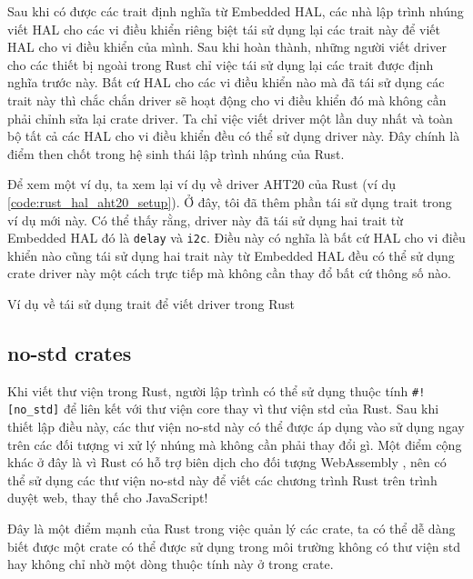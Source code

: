 Sau khi có được các trait định nghĩa từ Embedded HAL, các nhà lập trình nhúng viết HAL cho các vi điều khiển riêng biệt tái sử dụng lại các trait này để viết HAL cho vi điều khiển của mình.
Sau khi hoàn thành, những người viết driver cho các thiết bị ngoài trong Rust chỉ việc tái sử dụng lại các trait được định nghĩa trước này.
Bất cứ HAL cho các vi điều khiển nào mà đã tái sử dụng các trait này thì chắc chắn driver sẽ hoạt động cho vi điều khiển đó mà không cần phải chỉnh sửa lại crate driver.
Ta chỉ việc viết driver một lần duy nhất và toàn bộ tất cả các HAL cho vi điều khiển đều có thể sử dụng driver này.
Đây chính là điểm then chốt trong hệ sinh thái lập trình nhúng của Rust.

Để xem một ví dụ, ta xem lại ví dụ về driver AHT20 của Rust (ví dụ \ref{code:rust_hal_aht20_setup}).
Ở đây, tôi đã thêm phần tái sử dụng trait trong ví dụ mới này.
Có thể thấy rằng, driver này đã tái sử dụng hai trait từ Embedded HAL đó là \texttt{delay} và \texttt{i2c}.
Điều này có nghĩa là bất cứ HAL cho vi điều khiển nào cũng tái sử dụng hai trait này từ Embedded HAL đều có thể sử dụng crate driver này một cách trực tiếp mà không cần thay đổ bất cứ thông số nào.
\begin{listing}[ht]
\begin{rustcode}
use embedded_hal::blocking::{delay::DelayMs, i2c::{Write, WriteRead}};
pub fn new(i2c: I2C, delay: D) -> Result<Self, Error<E>> {
\end{rustcode}
\caption{Ví dụ về tái sử dụng trait để viết driver trong Rust}
\end{listing}

\subsection{no-std crates}\label{lbl:no_std_crates}
Khi viết thư viện trong Rust, người lập trình có thể sử dụng thuộc tính \texttt{#![no_std]} để liên kết với thư viện core thay vì thư viện std của Rust.
Sau khi thiết lập điều này, các thư viện no-std này có thể được áp dụng vào sử dụng ngay trên các đối tượng vi xử lý nhúng mà không cần phải thay đổi gì.
Một điểm cộng khác ở đây là vì Rust có hỗ trợ biên dịch cho đối tượng WebAssembly \cite{rustc_book}, nên có thể sử dụng các thư viện no-std này để viết các chương trình Rust trên trình duyệt web, thay thế cho JavaScript! \cite{hoffman2019programming, wasm_book}

Đây là một điểm mạnh của Rust trong việc quản lý các crate, ta có thể dễ dàng biết được một crate có thể được sử dụng trong môi trường không có thư viện std hay không chỉ nhờ một dòng thuộc tính này ở trong crate.

